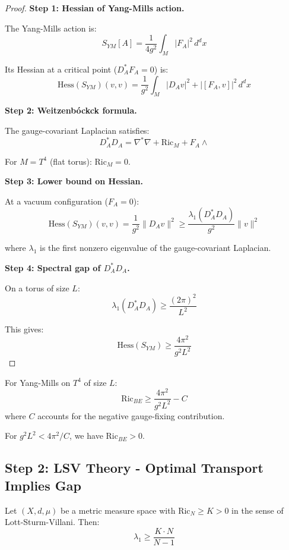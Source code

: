 \begin{proof}
\textbf{Step 1: Hessian of Yang-Mills action.}

The Yang-Mills action is:
\[
S_{YM}[A] = \frac{1}{4g^2} \int_M |F_A|^2 \, d^dx
\]

Its Hessian at a critical point ($D_A^* F_A = 0$) is:
\[
\mathrm{Hess}(S_{YM})(v, v) = \frac{1}{g^2} \int_M |D_A v|^2 + |[F_A, v]|^2 \, d^dx
\]

\textbf{Step 2: Weitzenb\'ockck formula.}

The gauge-covariant Laplacian satisfies:
\[
D_A^* D_A = \nabla^* \nabla + \mathrm{Ric}_M + F_A \wedge
\]

For $M = T^4$ (flat torus): $\mathrm{Ric}_M = 0$.

\textbf{Step 3: Lower bound on Hessian.}

At a vacuum configuration ($F_A = 0$):
\[
\mathrm{Hess}(S_{YM})(v, v) = \frac{1}{g^2} \|D_A v\|^2 \geq \frac{\lambda_1(D_A^* D_A)}{g^2} \|v\|^2
\]

where $\lambda_1$ is the first nonzero eigenvalue of the gauge-covariant Laplacian.

\textbf{Step 4: Spectral gap of $D_A^* D_A$.}

On a torus of size $L$:
\[
\lambda_1(D_A^* D_A) \geq \frac{(2\pi)^2}{L^2}
\]

This gives:
\[
\mathrm{Hess}(S_{YM}) \geq \frac{4\pi^2}{g^2 L^2}
\]
\end{proof}

\begin{corollary}
\label{cor:bakry-emery-bound}
For Yang-Mills on $T^4$ of size $L$:
\[
\mathrm{Ric}_{BE} \geq \frac{4\pi^2}{g^2 L^2} - C
\]
where $C$ accounts for the negative gauge-fixing contribution.

For $g^2 L^2 < 4\pi^2/C$, we have $\mathrm{Ric}_{BE} > 0$.
\end{corollary}

\subsection{Step 2: LSV Theory - Optimal Transport Implies Gap}

\begin{theorem}
\label{thm:lsv-gap}
Let $(X, d, \mu)$ be a metric measure space with $\mathrm{Ric}_N \geq K > 0$ 
in the sense of Lott-Sturm-Villani. Then:
\[
\lambda_1 \geq \frac{K \cdot N}{N-1}
\]
\end{theorem}


